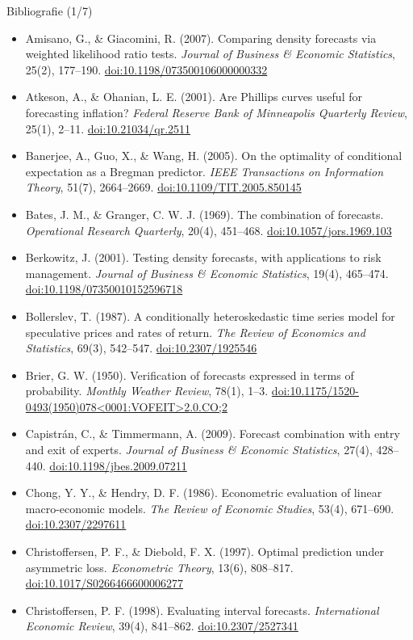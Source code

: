 \begin{frame}{Bibliografie (1/7)}
\itemsize{\tiny}
\begin{itemize}
    \item Amisano, G., \& Giacomini, R. (2007). Comparing density forecasts via weighted likelihood ratio tests. \textit{Journal of Business \& Economic Statistics}, 25(2), 177--190. \href{https://doi.org/10.1198/073500106000000332}{doi:10.1198/073500106000000332}
    \item Atkeson, A., \& Ohanian, L. E. (2001). Are Phillips curves useful for forecasting inflation? \textit{Federal Reserve Bank of Minneapolis Quarterly Review}, 25(1), 2--11. \href{https://doi.org/10.21034/qr.2511}{doi:10.21034/qr.2511}
    \item Banerjee, A., Guo, X., \& Wang, H. (2005). On the optimality of conditional expectation as a Bregman predictor. \textit{IEEE Transactions on Information Theory}, 51(7), 2664--2669. \href{https://doi.org/10.1109/TIT.2005.850145}{doi:10.1109/TIT.2005.850145}
    \item Bates, J. M., \& Granger, C. W. J. (1969). The combination of forecasts. \textit{Operational Research Quarterly}, 20(4), 451--468. \href{https://doi.org/10.1057/jors.1969.103}{doi:10.1057/jors.1969.103}
    \item Berkowitz, J. (2001). Testing density forecasts, with applications to risk management. \textit{Journal of Business \& Economic Statistics}, 19(4), 465--474. \href{https://doi.org/10.1198/07350010152596718}{doi:10.1198/07350010152596718}
    \item Bollerslev, T. (1987). A conditionally heteroskedastic time series model for speculative prices and rates of return. \textit{The Review of Economics and Statistics}, 69(3), 542--547. \href{https://doi.org/10.2307/1925546}{doi:10.2307/1925546}
    \item Brier, G. W. (1950). Verification of forecasts expressed in terms of probability. \textit{Monthly Weather Review}, 78(1), 1--3. \href{https://doi.org/10.1175/1520-0493(1950)078\%3C0001:VOFEIT\%3E2.0.CO;2}{doi:10.1175/1520-0493(1950)078\textless{}0001:VOFEIT\textgreater{}2.0.CO;2}
    \item Capistrán, C., \& Timmermann, A. (2009). Forecast combination with entry and exit of experts. \textit{Journal of Business \& Economic Statistics}, 27(4), 428--440. \href{https://doi.org/10.1198/jbes.2009.07211}{doi:10.1198/jbes.2009.07211}
    \item Chong, Y. Y., \& Hendry, D. F. (1986). Econometric evaluation of linear macro-economic models. \textit{The Review of Economic Studies}, 53(4), 671--690. \href{https://doi.org/10.2307/2297611}{doi:10.2307/2297611}
    \item Christoffersen, P. F., \& Diebold, F. X. (1997). Optimal prediction under asymmetric loss. \textit{Econometric Theory}, 13(6), 808--817. \href{https://doi.org/10.1017/S0266466600006277}{doi:10.1017/S0266466600006277}
    \item Christoffersen, P. F. (1998). Evaluating interval forecasts. \textit{International Economic Review}, 39(4), 841--862. \href{https://doi.org/10.2307/2527341}{doi:10.2307/2527341}
\end{itemize}
\end{frame}

